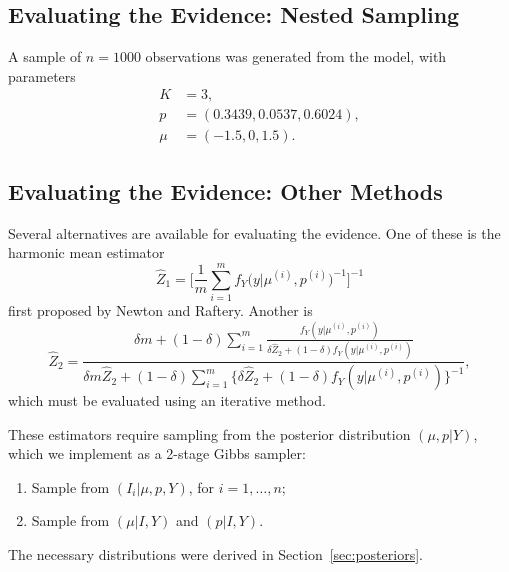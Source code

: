 \documentclass[11pt]{article}
\begin{document}
\subsection{Evaluating the Evidence: Nested Sampling}
A sample of $n = 1000$ observations was generated from the model, 
with parameters
\begin{align*}
    K &= 3, \\
    p &= (0.3439, 0.0537, 0.6024), \\
    \mu &= (-1.5, 0, 1.5).
\end{align*}

\subsection{Evaluating the Evidence: Other Methods}
Several alternatives are available for evaluating the evidence.
One of these is the harmonic mean estimator
\[
    \hat{Z}_1
    =
    \biggl[
        \frac{1}{m} \sum_{i=1}^m
        f_{Y}\bigl( y \vert \mu^{(i)}, p^{(i)} \bigr)^{-1}
    \biggr]^{-1}
\]
first proposed by Newton and Raftery. 
Another is
\[
    \hat{Z}_2
    =
    \frac{
        \delta m + (1 - \delta) \sum_{i=1}^m \frac{ 
            f_{Y}(y \vert \mu^{(i)}, p^{(i)}) 
        }{ 
            \delta \hat{Z}_2 + (1 - \delta) f_{Y}(y \vert \mu^{(i)}, p^{(i)}) 
        }
    }{
        \delta m \hat{Z}_2 
        + (1 - \delta) \sum_{i=1}^m \{\delta\hat{Z}_2 
        + (1 - \delta) f_{Y}(y \vert \mu^{(i)}, p^{(i)}) \}^{-1}
    },
\]
which must be evaluated using an iterative method.

These estimators require sampling from the posterior distribution 
$(\mu, p \vert Y)$, which we implement as a 2-stage Gibbs sampler:
\begin{enumerate}
\item Sample from $(I_i \vert \mu, p, Y)$, for $i = 1, \ldots, n$;
\item Sample from $(\mu \vert I, Y)$ and $(p \vert I, Y)$.
\end{enumerate}
The necessary distributions were derived in Section~\ref{sec:posteriors}.
\end{document}
